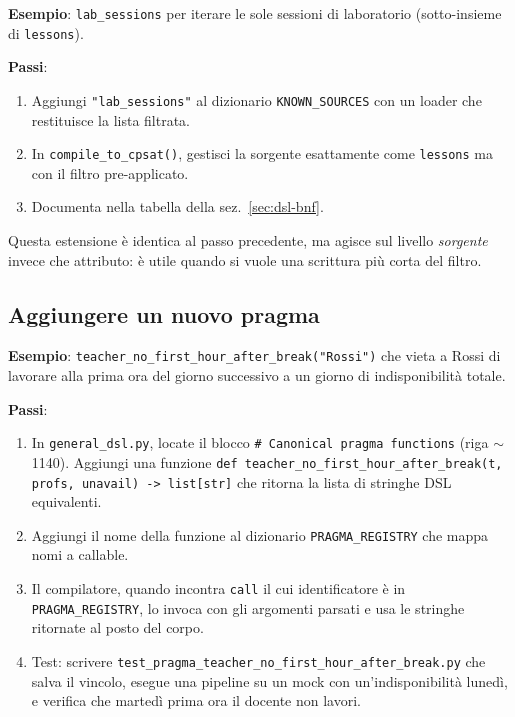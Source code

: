 \textbf{Esempio}: \texttt{lab\_sessions} per iterare le sole
sessioni di laboratorio (sotto-insieme di \texttt{lessons}).

\textbf{Passi}:
\begin{enumerate}
\item Aggiungi \texttt{"lab\_sessions"} al dizionario
  \texttt{KNOWN\_SOURCES} con un loader che restituisce la
  lista filtrata.
\item In \texttt{compile\_to\_cpsat()}, gestisci la sorgente
  esattamente come \texttt{lessons} ma con il filtro
  pre-applicato.
\item Documenta nella tabella della sez.~\ref{sec:dsl-bnf}.
\end{enumerate}

Questa estensione \`e identica al passo precedente, ma agisce
sul livello \emph{sorgente} invece che attributo: \`e utile
quando si vuole una scrittura pi\`u corta del filtro.

\subsection{Aggiungere un nuovo pragma}

\textbf{Esempio}: \texttt{teacher\_no\_first\_hour\_after\_break("Rossi")}
che vieta a Rossi di lavorare alla prima ora del giorno
successivo a un giorno di indisponibilit\`a totale.

\textbf{Passi}:
\begin{enumerate}
\item In \texttt{general\_dsl.py}, locate il blocco
  \texttt{\#\,Canonical pragma functions} (riga $\sim$1140).
  Aggiungi una funzione
  \texttt{def teacher\_no\_first\_hour\_after\_break(t, profs,
  unavail) -> list[str]} che ritorna la lista di stringhe DSL
  equivalenti.
\item Aggiungi il nome della funzione al dizionario
  \texttt{PRAGMA\_REGISTRY} che mappa nomi a callable.
\item Il compilatore, quando incontra \texttt{call} il cui
  identificatore \`e in \texttt{PRAGMA\_REGISTRY}, lo invoca
  con gli argomenti parsati e usa le stringhe ritornate al
  posto del corpo.
\item Test: scrivere
  \texttt{test\_pragma\_teacher\_no\_first\_hour\_after\_break.py}
  che salva il vincolo, esegue una pipeline su un mock con
  un'indisponibilit\`a luned\`i, e verifica che marted\`i
  prima ora il docente non lavori.
\end{enumerate}

